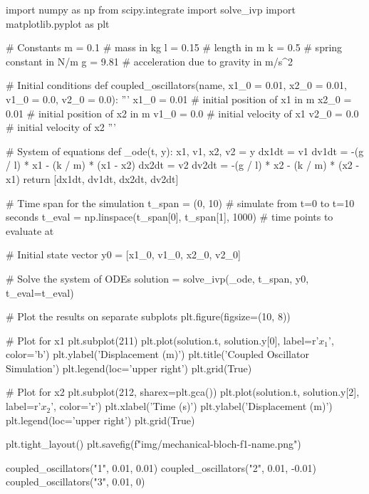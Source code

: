 \begin{python}
import numpy as np
from scipy.integrate import solve_ivp
import matplotlib.pyplot as plt

# Constants
m = 0.1  # mass in kg
l = 0.15  # length in m
k = 0.5  # spring constant in N/m
g = 9.81  # acceleration due to gravity in m/s^2

# Initial conditions
def coupled_oscillators(name, x1_0 = 0.01, x2_0 = 0.01, v1_0 = 0.0, v2_0 = 0.0):
  '''
  x1_0 = 0.01  # initial position of x1 in m
  x2_0 = 0.01  # initial position of x2 in m
  v1_0 = 0.0  # initial velocity of x1
  v2_0 = 0.0  # initial velocity of x2
  '''

  # System of equations
  def _ode(t, y):
    x1, v1, x2, v2 = y
    dx1dt = v1
    dv1dt = -(g / l) * x1 - (k / m) * (x1 - x2)
    dx2dt = v2
    dv2dt = -(g / l) * x2 - (k / m) * (x2 - x1)
    return [dx1dt, dv1dt, dx2dt, dv2dt]

  # Time span for the simulation
  t_span = (0, 10)  # simulate from t=0 to t=10 seconds
  t_eval = np.linspace(t_span[0], t_span[1], 1000)  # time points to evaluate at

  # Initial state vector
  y0 = [x1_0, v1_0, x2_0, v2_0]

  # Solve the system of ODEs
  solution = solve_ivp(_ode, t_span, y0, t_eval=t_eval)

  # Plot the results on separate subplots
  plt.figure(figsize=(10, 8))

  # Plot for x1
  plt.subplot(211)
  plt.plot(solution.t, solution.y[0], label=r'$x_1$', color='b')
  plt.ylabel('Displacement (m)')
  plt.title('Coupled Oscillator Simulation')
  plt.legend(loc='upper right')
  plt.grid(True)

  # Plot for x2
  plt.subplot(212, sharex=plt.gca())
  plt.plot(solution.t, solution.y[2], label=r'$x_2$', color='r')
  plt.xlabel('Time (s)')
  plt.ylabel('Displacement (m)')
  plt.legend(loc='upper right')
  plt.grid(True)

  plt.tight_layout()
  plt.savefig(f"img/mechanical-bloch-f1-{name}.png")

coupled_oscillators("1", 0.01, 0.01)
coupled_oscillators("2", 0.01, -0.01)
coupled_oscillators("3", 0.01, 0)
\end{python}

